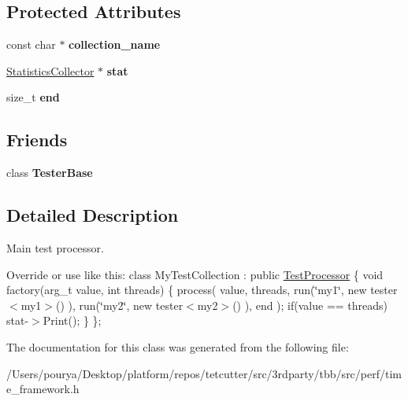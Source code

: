 \subsection*{Protected Attributes}
\begin{DoxyCompactItemize}
\item 
\hypertarget{classTestProcessor_ac80b299275b7e2fd325b39fce534d2b2}{}const char $\ast$ {\bfseries collection\+\_\+name}\label{classTestProcessor_ac80b299275b7e2fd325b39fce534d2b2}

\item 
\hypertarget{classTestProcessor_a0ad21efd0d66534f1b3ed5e407526a88}{}\hyperlink{classStatisticsCollector}{Statistics\+Collector} $\ast$ {\bfseries stat}\label{classTestProcessor_a0ad21efd0d66534f1b3ed5e407526a88}

\item 
\hypertarget{classTestProcessor_a1151a6c2d26b24c368d5ff1d9dceef1a}{}size\+\_\+t {\bfseries end}\label{classTestProcessor_a1151a6c2d26b24c368d5ff1d9dceef1a}

\end{DoxyCompactItemize}
\subsection*{Friends}
\begin{DoxyCompactItemize}
\item 
\hypertarget{classTestProcessor_a5b430836a624e942afefea7e3c4c18d8}{}class {\bfseries Tester\+Base}\label{classTestProcessor_a5b430836a624e942afefea7e3c4c18d8}

\end{DoxyCompactItemize}


\subsection{Detailed Description}
Main test processor. 

Override or use like this\+: class My\+Test\+Collection \+: public \hyperlink{classTestProcessor}{Test\+Processor} \{ void factory(arg\+\_\+t value, int threads) \{ process( value, threads, run(\char`\"{}my1\char`\"{}, new tester$<$my1$>$() ), run(\char`\"{}my2\char`\"{}, new tester$<$my2$>$() ), end ); if(value == threads) stat-\/$>$Print(); \} \}; 

The documentation for this class was generated from the following file\+:\begin{DoxyCompactItemize}
\item 
/\+Users/pourya/\+Desktop/platform/repos/tetcutter/src/3rdparty/tbb/src/perf/time\+\_\+framework.\+h\end{DoxyCompactItemize}
